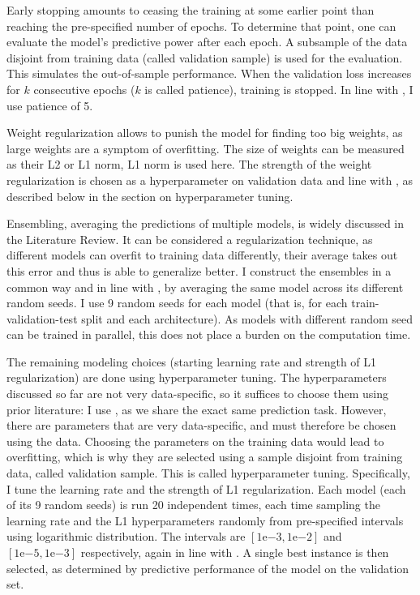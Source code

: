 	Early stopping amounts to ceasing the training at some earlier point than reaching the pre-specified number of epochs. To determine that point, one can evaluate the model's predictive power after each epoch. A subsample of the data disjoint from training data (called validation sample) is used for the evaluation. This simulates the out-of-sample performance. When the validation loss increases for $k$ consecutive epochs ($k$ is called patience), training is stopped. In line with \cite{gu2020empirical}, I use patience of 5. 
	
	Weight regularization allows to punish the model for finding too big weights, as large weights are a symptom of overfitting. The size of weights can be measured as their L2 or L1 norm, L1 norm is used here. The strength of the weight regularization is chosen as a hyperparameter on validation data and line with \cite{gu2020empirical}, as described below in the section on hyperparameter tuning.
	
	Ensembling, averaging the predictions of multiple models, is widely discussed in the Literature Review. It can be considered a regularization technique, as different models can overfit to training data differently, their average takes out this error and thus is able to generalize better. I construct the ensembles in a common way and in line with \cite{gu2020empirical}, by averaging the same model across its different random seeds. I use 9 random seeds for each model (that is, for each train-validation-test split and each architecture). As models with different random seed can be trained in parallel, this does not place a burden on the computation time.
		
	The remaining modeling choices (starting learning rate and strength of L1 regularization) are done using hyperparameter tuning. The hyperparameters discussed so far are not very data-specific, so it suffices to choose them using prior literature: I use \cite{gu2020empirical}, as we share the exact same prediction task. However, there are parameters that are very data-specific, and must therefore be chosen using the data. Choosing the parameters on the training data would lead to overfitting, which is why they are selected using a sample disjoint from training data, called validation sample. This is called hyperparameter tuning. Specifically, I tune the learning rate and the strength of L1 regularization. Each model (each of its 9 random seeds) is run 20 independent times, each time sampling the learning rate and the L1 hyperparameters randomly from pre-specified intervals using logarithmic distribution. The intervals are $\left[1\mathrm{e}{-3}, 1\mathrm{e}{-2}\right]$ and $\left[1\mathrm{e}{-5}, 1\mathrm{e}{-3}\right]$ respectively, again in line with \cite{gu2020empirical}. A single best instance is then selected, as determined by predictive performance of the model on the validation set.
	
